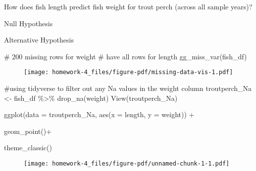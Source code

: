 \documentclass[
  letterpaper,
  DIV=11,
  numbers=noendperiod]{scrartcl}
\newenvironment{Shaded}{\begin{snugshade}}{\end{snugshade}}
\newcommand{\AttributeTok}[1]{\textcolor[rgb]{0.40,0.45,0.13}{#1}}
\newcommand{\CommentTok}[1]{\textcolor[rgb]{0.37,0.37,0.37}{#1}}
\newcommand{\FunctionTok}[1]{\textcolor[rgb]{0.28,0.35,0.67}{#1}}
\newcommand{\NormalTok}[1]{\textcolor[rgb]{0.00,0.23,0.31}{#1}}
\newcommand{\OtherTok}[1]{\textcolor[rgb]{0.00,0.23,0.31}{#1}}
\newcommand{\SpecialCharTok}[1]{\textcolor[rgb]{0.37,0.37,0.37}{#1}}
\begin{document}
How does fish length predict fish weight for trout perch (across all
sample years)?

Null Hypothesis

Alternative Hypothesis

\begin{Shaded}
\begin{Highlighting}[]
\CommentTok{\# 200 missing rows for weight}
\CommentTok{\# have all rows for length }
\FunctionTok{gg\_miss\_var}\NormalTok{(fish\_df)}
\end{Highlighting}
\end{Shaded}

\begin{figure}[H]

{\centering \texttt{[image: homework-4\_files/figure-pdf/missing-data-vis-1.pdf]}

}

\end{figure}

\begin{Shaded}
\begin{Highlighting}[]
\CommentTok{\#using tidyverse to filter out any Na values in the weight column }
\NormalTok{troutperch\_Na }\OtherTok{\textless{}{-}}\NormalTok{ fish\_df }\SpecialCharTok{\%\textgreater{}\%} 
  \FunctionTok{drop\_na}\NormalTok{(weight)}
\FunctionTok{View}\NormalTok{(troutperch\_Na)}
\end{Highlighting}
\end{Shaded}

\begin{Shaded}
\begin{Highlighting}[]
\FunctionTok{ggplot}\NormalTok{(}\AttributeTok{data =}\NormalTok{ troutperch\_Na, }\FunctionTok{aes}\NormalTok{(}\AttributeTok{x =}\NormalTok{ length, }\AttributeTok{y =}\NormalTok{ weight)) }\SpecialCharTok{+} 
  
  \FunctionTok{geom\_point}\NormalTok{()}\SpecialCharTok{+}
  
  \FunctionTok{theme\_classic}\NormalTok{()}
\end{Highlighting}
\end{Shaded}

\begin{figure}[H]

{\centering \texttt{[image: homework-4\_files/figure-pdf/unnamed-chunk-1-1.pdf]}

}

\end{figure}
\end{document}
